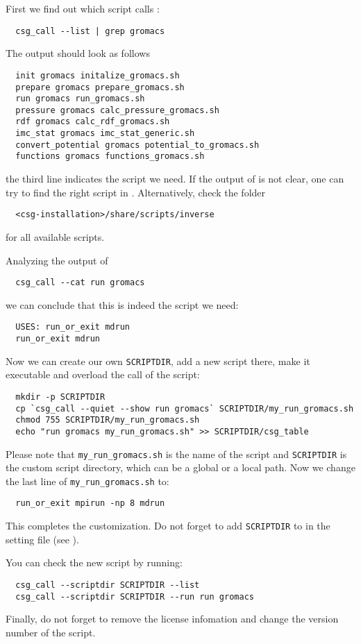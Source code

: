 First we find out which script calls :
\begin{verbatim}
  csg_call --list | grep gromacs
\end{verbatim}
The output should look as follows
\begin{verbatim}
  init gromacs initalize_gromacs.sh
  prepare gromacs prepare_gromacs.sh
  run gromacs run_gromacs.sh
  pressure gromacs calc_pressure_gromacs.sh
  rdf gromacs calc_rdf_gromacs.sh
  imc_stat gromacs imc_stat_generic.sh
  convert_potential gromacs potential_to_gromacs.sh
  functions gromacs functions_gromacs.sh
\end{verbatim}
the third line indicates the script we need. If the output of  is not clear, one can try to find the right script in . Alternatively, check the folder
\begin{verbatim}
  <csg-installation>/share/scripts/inverse
\end{verbatim}
for all available scripts. 

Analyzing the output of
\begin{verbatim}
  csg_call --cat run gromacs
\end{verbatim}
we can conclude that this is indeed the script we need:
%
\begin{verbatim}
  USES: run_or_exit mdrun
  run_or_exit mdrun
\end{verbatim}
Now we can create our own \texttt{SCRIPTDIR}, add a new script there, make it executable and overload the call of the script:
\begin{verbatim}
  mkdir -p SCRIPTDIR
  cp `csg_call --quiet --show run gromacs` SCRIPTDIR/my_run_gromacs.sh
  chmod 755 SCRIPTDIR/my_run_gromacs.sh
  echo "run gromacs my_run_gromacs.sh" >> SCRIPTDIR/csg_table
\end{verbatim}
Please note that \texttt{my\_run\_gromacs.sh} is the name of the script and \texttt{SCRIPTDIR} is the custom script directory, which can be a global or a local path.
Now we change the last line of \texttt{my\_run\_gromacs.sh} to:
\begin{verbatim}
  run_or_exit mpirun -np 8 mdrun
\end{verbatim}
This completes the customization. Do not forget to add \texttt{SCRIPTDIR} to  in the setting \xml file (see ).

You can check the new script by running:
\begin{verbatim}
  csg_call --scriptdir SCRIPTDIR --list
  csg_call --scriptdir SCRIPTDIR --run run gromacs
\end{verbatim}

Finally, do not forget to remove the license infomation and change the version number of the script.

